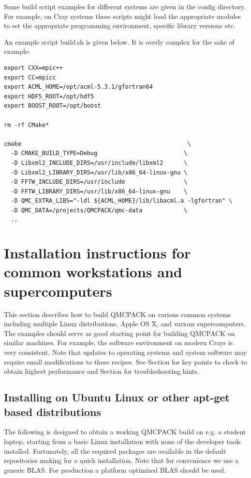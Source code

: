 Some build script examples for different systems are given in the
config directory. For example, on Cray systems these scripts might
load the appropriate modules to set the appropriate programming
environment, specific library versions etc.

An example script build.sh is given below. It is overly complex for
the sake of example:

\begin{verbatim}
export CXX=mpic++
export CC=mpicc
export ACML_HOME=/opt/acml-5.3.1/gfortran64
export HDF5_ROOT=/opt/hdf5
export BOOST_ROOT=/opt/boost

rm -rf CMake*

cmake                                                \
  -D CMAKE_BUILD_TYPE=Debug                         \
  -D Libxml2_INCLUDE_DIRS=/usr/include/libxml2      \
  -D Libxml2_LIBRARY_DIRS=/usr/lib/x86_64-linux-gnu \
  -D FFTW_INCLUDE_DIRS=/usr/include                 \
  -D FFTW_LIBRARY_DIRS=/usr/lib/x86_64-linux-gnu    \
  -D QMC_EXTRA_LIBS="-ldl ${ACML_HOME}/lib/libacml.a -lgfortran" \
  -D QMC_DATA=/projects/QMCPACK/qmc-data            \
  ..
\end{verbatim}

\section{Installation instructions for common workstations and
  supercomputers}
\label{sec:installexamples}

This section describes how to build QMCPACK on various common systems
including multiple Linux distributions, Apple OS X, and various
supercomputers. The examples should serve as good starting point for
building QMCPACK on similar machines. For example, the software
environment on modern Crays is very consistent. Note that updates to
operating systems and system software may require small modifications
to these recipes. See Section \label{sec:buildperformance} for key
points to check to obtain highest performance and
Section \label{sec:troubleshoot} for troubleshooting hints.

\subsection{Installing on Ubuntu Linux or other apt-get based distributions}

The following is designed to obtain a working QMCPACK build on e.g. a
student laptop, starting from a basic Linux installation with none of
the developer tools installed. Fortunately, all the required packages
are available in the default repositories making for a quick
installation. Note that for convenience we use a generic BLAS. For
production a platform optimized BLAS should be used.

